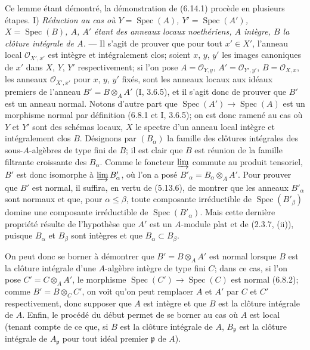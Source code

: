 \documentclass[10pt,oneside]{book}
\begin{document}
Ce lemme étant démontré, la démonstration de (6.14.1) procède en plusieurs
étapes.
I) \emph{Réduction au cas où $Y=\operatorname{Spec}(A)$,
$Y'=\operatorname{Spec}(A')$, $X=\operatorname{Spec}(B)$, $A$, $A'$ étant
des anneaux locaux noethériens, $A$ intègre, $B$ la clôture intégrale de
$A$.} --- Il s'agit de prouver que pour tout $x'\in X'$, l'anneau local
$\mathcal O_{X',x'}$ est intègre et intégralement clos; soient $x$, $y$,
$y'$ les images canoniques de $x'$ dans $X$, $Y$, $Y'$ respectivement; si
l'on pose $A=\mathcal O_{Y,y}$, $A'=\mathcal O_{Y',y'}$,
$B=\mathcal O_{X,x}$, les anneaux $\mathcal O_{X',x'}$ pour $x$, $y$, $y'$
fixés, sont les anneaux locaux aux idéaux premiers de l'anneau
$B'=B\otimes_A A'$ (I, 3.6.5), et il s'agit donc de prouver que $B'$ est un
anneau normal. Notons d'autre part que
$\operatorname{Spec}(A')\to\operatorname{Spec}(A)$ est un morphisme normal
par définition (6.8.1 et I, 3.6.5); on est donc ramené au cas où $Y$ et $Y'$
sont des schémas locaux, $X$ le spectre d'un anneau local intègre et
intégralement clos $B$. Désignons par $(B_\alpha)$ la famille des clôtures
intégrales des sous-$A$-algèbres de type fini de $B$; il est clair que $B$
est réunion de la famille filtrante croissante des $B_\alpha$. Comme le
foncteur $\varinjlim$ commute au produit tensoriel, $B'$ est donc isomorphe
à $\varinjlim B'_\alpha$, où l'on a posé
$B'_\alpha=B_\alpha\otimes_A A'$. Pour prouver que $B'$ est normal, il
suffira, en vertu de (5.13.6), de montrer que les anneaux $B'_\alpha$ sont
normaux et que, pour $\alpha\leqslant\beta$, toute composante irréductible
de $\operatorname{Spec}(B'_\beta)$ domine une composante irréductible de
$\operatorname{Spec}(B'_\alpha)$. Mais cette dernière propriété résulte de
l'hypothèse que $A'$ est un $A$-module plat et de (2.3.7, (ii)), puisque
$B_\alpha$ et $B_\beta$ sont intègres et que $B_\alpha\subset B_\beta$.

On peut donc se borner à démontrer que $B'=B\otimes_A A'$ est normal lorsque
$B$ est la clôture intégrale d'une $A$-algèbre intègre de type fini $C$;
dans ce cas, si l'on pose $C'=C\otimes_A A'$, le morphisme
$\operatorname{Spec}(C')\to\operatorname{Spec}(C)$ est normal (6.8.2);
comme $B'=B\otimes_C C'$, on voit qu'on peut remplacer $A$ et $A'$ par $C$
et $C'$ respectivement, donc supposer que $A$ est intègre et que $B$ est la
clôture intégrale de $A$. Enfin, le procédé du début permet de se borner au
cas où $A$ est local (tenant compte de ce que, si $B$ est la clôture
intégrale de $A$, $B_\mathfrak p$ est la clôture intégrale de
$A_\mathfrak p$ pour tout idéal premier $\mathfrak p$ de $A$).
\end{document}
